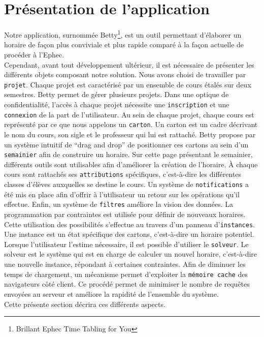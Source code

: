 

\chapter{Présentation de l'application}
Notre application, surnommée Betty\footnote{Brillant Ephec Time Tabling for You}, est un outil permettant d'élaborer un horaire de façon plus conviviale et plus rapide comparé à la façon actuelle de procéder à l'Ephec.\\
\newline
\indent
Cependant, avant tout développement ultérieur, il est nécessaire de présenter les différents objets composant notre solution. Nous avons choisi de travailler par \texttt{projet}. Chaque projet est caractérisé par un ensemble de cours étalés sur deux semestres. Betty permet de gérer plusieurs projets. Dans une optique de confidentialité, l'accès à chaque projet nécessite une \texttt{inscription} et une \texttt{connexion} de la part de l'utilisateur.
\newline
\indent
Au sein de chaque projet, chaque cours est représenté par ce que nous appelons un \texttt{carton}. Un carton est un cadre décrivant le nom du cours, son sigle et le professeur qui lui est rattaché. Betty propose par un système intuitif de \enquote{drag and drop} de positionner ces cartons au sein d'un \texttt{semainier} afin de construire un horaire.
\newline
\indent
Sur cette page présentant le semainier, différents outils sont utilisables afin d'améliorer la création de l'horaire. À chaque cours sont rattachés ses \texttt{attributions} spécifiques, c'est-à-dire les différentes classes d'élèves auxquelles se destine le cours. Un système de \texttt{notifications} a été mis en place afin d'offrir à l'utilisateur un retour sur les opérations qu'il effectue. Enfin, un système de \texttt{filtres} améliore la vision des données. 
\newline
\indent
La programmation par contraintes est utilisée pour définir de nouveaux horaires. Cette utilisation des possibilités s'effectue au travers d'un panneau d'\texttt{instances}. Une instance  est un état spécifique des cartons, c'est-à-dire un horaire potentiel. Lorsque l'utilisateur l'estime nécessaire, il est possible d'utiliser le  \texttt{solveur}. Le solveur est le système qui est en charge de calculer un nouvel horaire, c'est-à-dire une nouvelle instance, répondant à certaines contraintes.
\newline
\indent
Afin de diminuer les temps de chargement, un mécanisme permet d'exploiter la \texttt{mémoire cache} des navigateurs côté client. Ce procédé permet de minimiser le nombre de requêtes envoyées au serveur et améliore la rapidité de l'ensemble du système.\\
\newline
\indent
Cette présente section décrira ces différents aspects.



